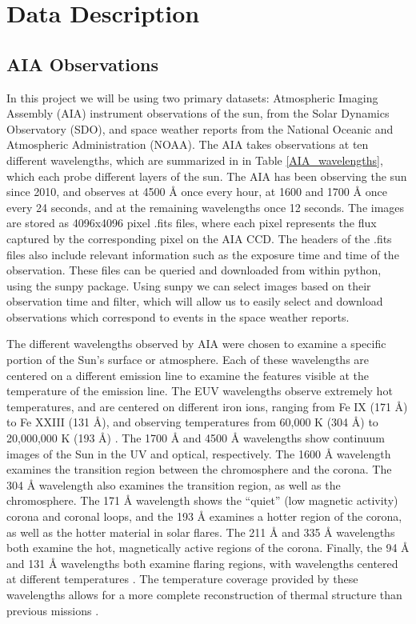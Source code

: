 \documentclass[12pt, letterpaper]{article}
\begin{document}
\section*{Data Description}

\subsection*{AIA Observations}

In this project we will be using two primary datasets: Atmospheric Imaging Assembly (AIA) instrument observations of the sun, from the Solar Dynamics Observatory (SDO), and space weather reports from the National Oceanic and Atmospheric Administration (NOAA).
The AIA takes observations at ten different wavelengths, which are summarized in in Table \ref{AIA_wavelengths}, which each probe different layers of the sun. The AIA has been observing the sun since 2010, and observes at 4500 Å once every hour, at 1600 and 1700 Å once every 24 seconds, and at the remaining wavelengths once 12 seconds. The images are stored as 4096x4096 pixel .fits files, where each pixel represents the flux captured by the corresponding pixel on the AIA CCD. The headers of the .fits files also include relevant information such as the exposure time and time of the observation. These files can be queried and downloaded from within python, using the sunpy package. Using sunpy we can select images based on their observation time and filter, which will allow us to easily select and download observations which correspond to events in the space weather reports. 

The different wavelengths observed by AIA were chosen to examine a specific portion of the Sun’s surface or atmosphere. Each of these wavelengths are centered on a different emission line to examine the features visible at the temperature of the emission line. The EUV wavelengths observe extremely hot temperatures, and are centered on different iron ions, ranging from Fe IX (171 Å) to Fe XXIII (131 Å), and observing temperatures from 60,000 K (304 Å) to 20,000,000 K (193 Å) \cite{Lemen2012}. The 1700 Å and 4500 Å wavelengths show continuum images of the Sun in the UV and optical, respectively. The 1600 Å wavelength examines the transition region between the chromosphere and the corona. The 304 Å wavelength also examines the transition region, as well as the chromosphere. The 171 Å wavelength shows the “quiet” (low magnetic activity) corona and coronal loops, and the 193 Å examines a hotter region of the corona, as well as the hotter material in solar flares. The 211 Å and 335 Å wavelengths both examine the hot, magnetically active regions of the corona. Finally, the 94 Å and 131 Å wavelengths both examine flaring regions, with wavelengths centered at different temperatures \cite{Zell2015}. The temperature coverage provided by these wavelengths allows for a more complete reconstruction of thermal structure than previous missions \cite{AIA_ConceptReport}.
\end{document}
